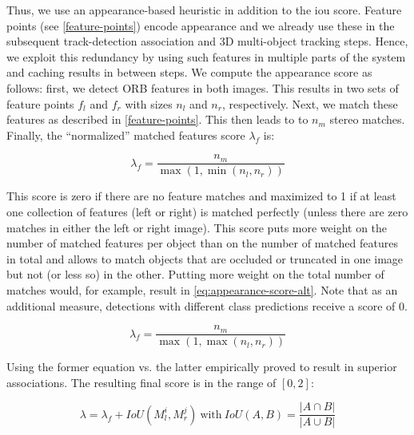 \documentclass[headsepline, hidelinks, footsepline, footinclude=false, oneside, fontsize=11pt, paper=a4, listof=totoc, bibliography=totoc]{scrbook}
\begin{document}
Thus, we use an appearance-based heuristic in addition to the \gls{iou} score. 
Feature points (see \cref{feature-points}) encode appearance and we already use these in the subsequent track-detection association and 3D multi-object tracking steps. 
Hence, we exploit this redundancy by using such features in multiple parts of the system and caching results in between steps.
We compute the appearance score as follows: first, we detect ORB \cite{rubleeORBEfficientAlternative2011} features in both images. This results in two sets of feature points \(f_l\) and \(f_r\) with sizes \(n_l\) and \(n_r\), respectively. 
Next, we match these features as described in \cref{feature-points}. This then leads to to \(n_m\) stereo matches. 
Finally, the ``normalized'' matched features score \(\lambda_f\) is:

\begin{equation}
\label{eq:appearance-score}
\lambda_f = \frac{n_m}{\max(1, \min(n_l, n_r))} 
\end{equation}

This score is zero if there are no feature matches and maximized to 1 if at least one collection of features (left or right) is matched perfectly (unless there are zero matches in either the left or right image).
This score puts more weight on the number of matched features per object than on the number of matched features in total and allows to match objects that are occluded or truncated in one image but not (or less so) in the other. Putting more weight on the total number of matches would, for example, result in \cref{eq:appearance-score-alt}.
Note that as an additional measure, detections with different class predictions receive a score of 0.

\begin{equation}
\label{eq:appearance-score-alt}
\lambda_f = \frac{n_m}{\max(1, \max(n_l, n_r))} 
\end{equation}

Using the former equation vs. the latter empirically proved to result in superior associations. 
The resulting final score is in the range of \([0, 2]\):

\begin{equation}
\label{eq:final-score-2d-association}
\lambda = \lambda_f + IoU(M_l^i, M_r^j)~\text{with}~IoU(A, B) = \frac{|A \cap B|}{|A \cup B|}
\end{equation}
\end{document}
